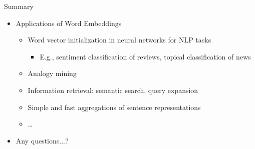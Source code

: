 
\begin{vbframe}{Summary}

\vfill

\begin{itemize}
	\item Applications of Word Embeddings
		\begin{itemize}
			\item Word vector initialization in neural networks for NLP tasks
				\begin{itemize}
					\item E.g., sentiment classification of reviews, topical classification of news 
				\end{itemize}
			\item Analogy mining
			\item Information retrieval: semantic search, query expansion
			\item Simple and fast aggregations of sentence representations
			\item \dots
		\end{itemize}
	\item Any questions...?
\end{itemize}

\vfill

\end{vbframe}


\endlecture

